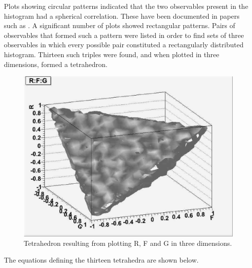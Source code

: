 \documentclass[a4paper,12pt]{article}
\begin{document}
Plots showing circular patterns indicated that the two observables present in the histogram had a spherical correlation.  These have been documented in papers such as \cite{info}. A significant number of plots showed rectangular patterns.  Pairs of observables that formed such a pattern were listed in order to find sets of three observables in which every possible pair constituted a rectangularly distributed histogram.  Thirteen such triples were found, and when plotted in three dimensions, formed a tetrahedron.

\begin{figure}[!h]
 \begin{center}
  \includegraphics[scale=0.3]{RFG.eps}
  \caption{Tetrahedron resulting from plotting R, F and G in three dimensions.}
 \end{center}
\end{figure}

The equations defining the thirteen tetrahedra are shown below.
\end{document}
